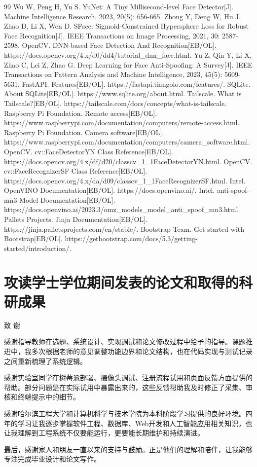 \documentclass[UTF8]{heuthesis}
\begin{document}
\begin{thebibliography}{99}
 Wu W, Peng H, Yu S. YuNet: A Tiny Millisecond-level Face Detector[J]. Machine Intelligence Research, 2023, 20(5): 656-665.
 Zhong Y, Deng W, Hu J, Zhao D, Li X, Wen D. SFace: Sigmoid-Constrained Hypersphere Loss for Robust Face Recognition[J]. IEEE Transactions on Image Processing, 2021, 30: 2587-2598.
 OpenCV. DNN-based Face Detection And Recognition[EB/OL]. https://docs.opencv.org/4.x/d0/dd4/tutorial\_dnn\_face.html.
 Yu Z, Qin Y, Li X, Zhao C, Lei Z, Zhao G. Deep Learning for Face Anti-Spoofing: A Survey[J]. IEEE Transactions on Pattern Analysis and Machine Intelligence, 2023, 45(5): 5609-5631.
 FastAPI. Features[EB/OL]. https://fastapi.tiangolo.com/features/.
 SQLite. About SQLite[EB/OL]. https://www.sqlite.org/about.html.
 Tailscale. What is Tailscale?[EB/OL]. https://tailscale.com/docs/concepts/what-is-tailscale.
 Raspberry Pi Foundation. Remote access[EB/OL]. https://www.raspberrypi.com/documentation/computers/remote-access.html.
 Raspberry Pi Foundation. Camera software[EB/OL]. https://www.raspberrypi.com/documentation/computers/camera\_software.html.
 OpenCV. cv::FaceDetectorYN Class Reference[EB/OL]. https://docs.opencv.org/4.x/df/d20/classcv\_1\_1FaceDetectorYN.html.
 OpenCV. cv::FaceRecognizerSF Class Reference[EB/OL]. https://docs.opencv.org/4.x/da/d09/classcv\_1\_1FaceRecognizerSF.html.
 Intel. OpenVINO Documentation[EB/OL]. https://docs.openvino.ai/.
 Intel. anti-spoof-mn3 Model Documentation[EB/OL]. https://docs.openvino.ai/2023.3/omz\_models\_model\_anti\_spoof\_mn3.html.
 Pallets Projects. Jinja Documentation[EB/OL]. https://jinja.palletsprojects.com/en/stable/.
 Bootstrap Team. Get started with Bootstrap[EB/OL]. https://getbootstrap.com/docs/5.3/getting-started/introduction/.
\end{thebibliography}
\chapter*{攻读学士学位期间发表的论文和取得的科研成果}
致 谢

感谢指导教师在选题、系统设计、实现调试和论文修改过程中给予的指导。课题推进中，我多次根据老师的意见调整功能边界和论文结构，也在代码实现与测试记录之间重新梳理了系统逻辑。

感谢实验室同学在树莓派部署、摄像头调试、注册流程试用和页面反馈方面提供的帮助。部分问题是在实际试用中暴露出来的，这些反馈帮助我及时修正了采集、审核和终端提示中的细节。

感谢哈尔滨工程大学和计算机科学与技术学院为本科阶段学习提供的良好环境。四年的学习让我逐步掌握软件工程、数据库、Web开发和人工智能应用相关知识，也让我理解到工程系统不仅要能运行，更要能长期维护和持续演进。

最后，感谢家人和朋友一直以来的支持与鼓励。正是他们的理解和陪伴，让我能够专注完成毕业设计和论文写作。
\end{document}

